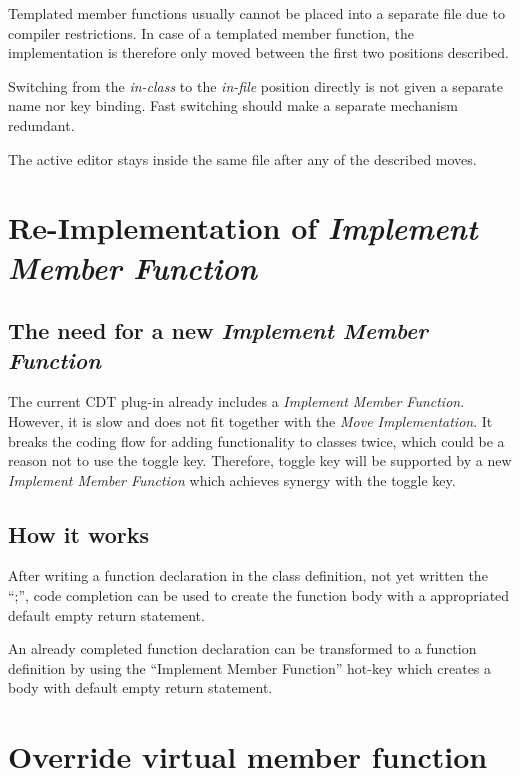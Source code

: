 Templated member functions  usually cannot be placed into
a separate file due to compiler restrictions. In case of a templated member
function, the implementation is therefore only moved between the first two
positions described.

Switching from the \textit{in-class} to the \textit{in-file} position directly
is not given a separate name nor key binding. Fast switching should make a
separate mechanism redundant. 

The active editor  stays inside the same file after any of
the described moves.

\section{Re-Implementation of \textit{Implement Member Function}}

\subsection{The need for a new \textit{Implement Member Function}}

The current CDT plug-in already includes a \textit{Implement Member Function}.
However, it is slow and does not fit together with the \textit{Move
Implementation}. It breaks the coding flow for adding functionality to classes
twice, which could be a reason not to use the toggle key. Therefore, toggle key
will be supported by a new \textit{Implement Member Function} which achieves
synergy with the toggle key.

\subsection{How it works}
After writing a function declaration in the class definition, not yet written
the ``;'', code completion can be used to create the function body with a
appropriated default empty return statement.\newline

An already completed function declaration can be transformed to a function
definition by using the ``Implement Member Function'' hot-key which creates a
body with default empty return statement.

\section{Override virtual member function}
